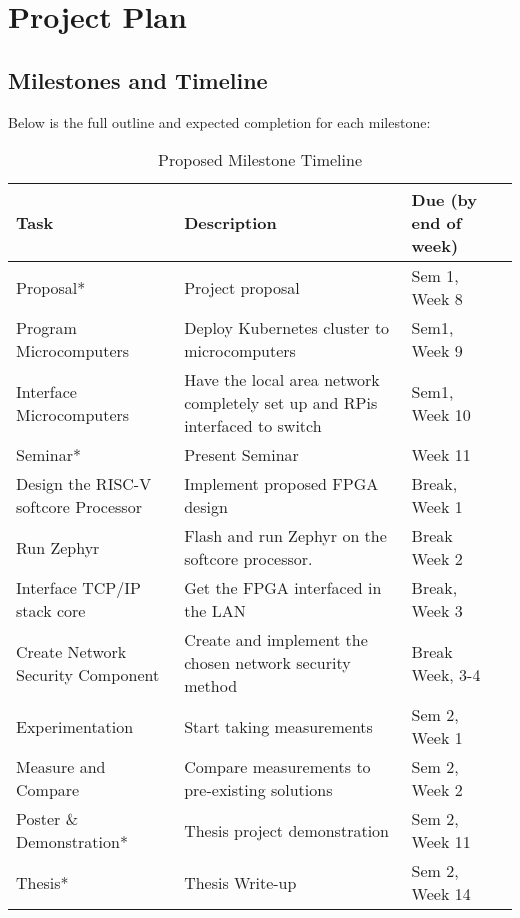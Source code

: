 \chapter[Project Outline]{Project Plan}
\label{Chap:Project Outline}

\section{Milestones and Timeline}
Below is the full outline and expected completion for each milestone:
\begin{table}[hbt!]
    \centering%
        \caption{Proposed Milestone Timeline}\label{table:Milestones}
        \begin{tabularx}{\textwidth}{ lXll }
            \hline
            Task & Description & Due (by end of week) \\ 
            \hline
            Proposal* & Project proposal & Sem 1, Week 8 \\
            Program Microcomputers & Deploy Kubernetes cluster to microcomputers & Sem1, Week 9 \\
            Interface Microcomputers & Have the local area network completely set up and RPis interfaced to switch & Sem1, Week 10 \\
            Seminar* & Present Seminar & Week 11 \\
            Design the RISC-V softcore Processor & Implement proposed FPGA design & Break, Week 1 \\
            Run Zephyr & Flash and run Zephyr on the softcore processor. & Break Week 2 \\
            Interface TCP/IP stack core & Get the FPGA interfaced in the LAN  & Break, Week 3 \\ 
            Create Network Security Component & Create and implement the chosen network security method & Break Week, 3-4 \\ 
            Experimentation & Start taking measurements & Sem 2, Week 1 \\ 
            Measure and Compare &  Compare measurements to pre-existing solutions & Sem 2, Week 2 \\ 
            Poster \& Demonstration* & Thesis project demonstration & Sem 2, Week 11 \\
            Thesis* & Thesis Write-up & Sem 2, Week 14 \\
            \hline
            \end{tabularx}
    \end{table}